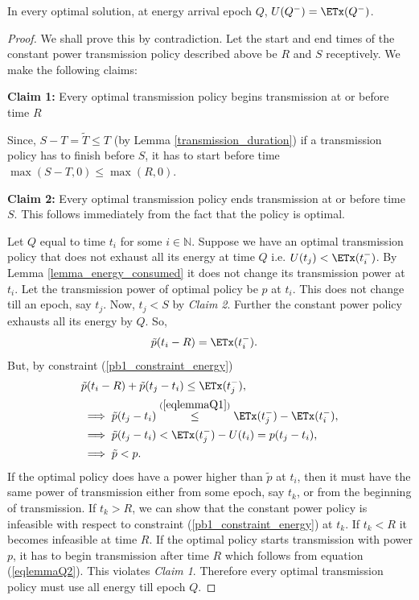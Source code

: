 \begin{lemma}
In every optimal solution, at energy arrival epoch $Q$, $U(Q^-)=\ETx(Q^-)$.
\label{lemma_Q}
\end{lemma}
\begin{proof}
We shall prove this by contradiction. Let the start and end times of the constant power transmission policy described above be $R$ and $S$ receptively. We make the following claims:

\textbf{Claim 1:} Every optimal transmission policy begins transmission at or before time $R$

Since, $S-T=\widetilde{T}\le T$ (by Lemma \ref{transmission_duration}) if a transmission policy has to finish before $S$, it has to start before time $\max(S-T,0) \le \max(R,0)$. 


\textbf{Claim 2:} Every optimal transmission policy ends transmission at or before time $S$.
This follows immediately from the fact that the policy is optimal.

Let $Q$ equal to time $t_i$ for some $i\in\mathbb{N}$. Suppose we have an optimal transmission policy that does not exhaust all its energy at time $Q$ i.e. $U(t_j)<\ETx(t_i^-)$. By Lemma \ref{lemma_energy_consumed} it does not change its transmission power at $t_i$. Let the transmission power of optimal policy be $p$ at $t_i$. This does not change till an epoch, say $t_j$. Now, $t_j<S$ by \textit{Claim 2}. Further the constant power policy exhausts all its energy by $Q$. So,
\begin{align}
&\tilde{p}(t_i-R)=\ETx(t_i^-)\label{eqlemmaQ1}.
\end{align}
But, by constraint (\ref{pb1_constraint_energy})
\begin{align}
&\tilde{p}(t_i-R)+\tilde{p}(t_j-t_i)\le \ETx(t_j^-),
\\
&\implies \tilde{p}(t_j-t_i)\stackrel{(\ref{eqlemmaQ1})}{\le} \ETx(t_j^-)-\ETx(t_i^-),\\
&\implies \tilde{p}(t_j-t_i)< \ETx(t_j^-)-U(t_i)=p(t_j-t_i),\\
&\implies \tilde{p}<p .\label{eqlemmaQ2}
\end{align}
If the optimal policy does have a power higher than $\tilde{p}$ at $t_i$, then it must have the same power of transmission either from some epoch, say $t_k$, or from the beginning of transmission. If $t_k>R$, we can show that the constant power policy is infeasible with respect to constraint (\ref{pb1_constraint_energy}) at $t_k$. If $t_k<R$ it becomes infeasible at time $R$. If the optimal policy starts transmission with power $p$, it has to begin transmission after time $R$ which follows from equation (\ref{eqlemmaQ2}). This violates \textit{Claim 1}. Therefore every optimal transmission policy must use all energy till epoch $Q$.
\end{proof}

